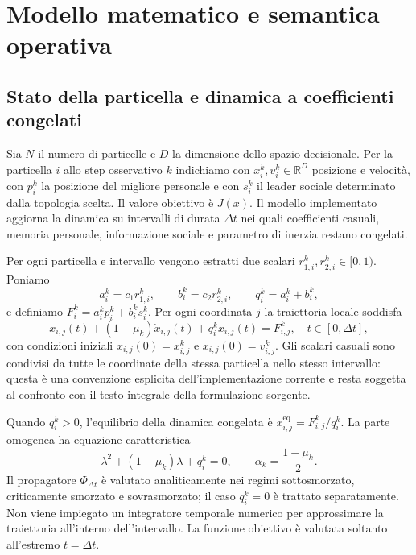 \section{Modello matematico e semantica operativa}
\label{sec:model}

\subsection{Stato della particella e dinamica a coefficienti congelati}

Sia $N$ il numero di particelle e $D$ la dimensione dello spazio decisionale. Per la particella $i$ allo step osservativo $k$ indichiamo con $x_i^k,v_i^k\in\mathbb{R}^D$ posizione e velocità, con $p_i^k$ la posizione del migliore personale e con $s_i^k$ il leader sociale determinato dalla topologia scelta. Il valore obiettivo è $J(x)$. Il modello implementato aggiorna la dinamica su intervalli di durata $\Delta t$ nei quali coefficienti casuali, memoria personale, informazione sociale e parametro di inerzia restano congelati.

Per ogni particella e intervallo vengono estratti due scalari $r_{1,i}^k,r_{2,i}^k\in[0,1)$. Poniamo
\begin{equation}
  a_i^k=c_1r_{1,i}^k,\qquad b_i^k=c_2r_{2,i}^k,
  \qquad q_i^k=a_i^k+b_i^k,
  \label{eq:frozen-coefficients}
\end{equation}
e definiamo $F_i^k=a_i^kp_i^k+b_i^ks_i^k$. Per ogni coordinata $j$ la traiettoria locale soddisfa
\begin{equation}
  \ddot{x}_{i,j}(t)+(1-\mu_k)\dot{x}_{i,j}(t)
  +q_i^kx_{i,j}(t)=F_{i,j}^k,
  \quad t\in[0,\Delta t],
  \label{eq:cpso-frozen-ode}
\end{equation}
con condizioni iniziali $x_{i,j}(0)=x_{i,j}^k$ e $\dot{x}_{i,j}(0)=v_{i,j}^k$. Gli scalari casuali sono condivisi da tutte le coordinate della stessa particella nello stesso intervallo: questa è una convenzione esplicita dell'implementazione corrente e resta soggetta al confronto con il testo integrale della formulazione sorgente.

Quando $q_i^k>0$, l'equilibrio della dinamica congelata è $x_{i,j}^{\mathrm{eq}}=F_{i,j}^k/q_i^k$. La parte omogenea ha equazione caratteristica
\begin{equation}
  \lambda^2+(1-\mu_k)\lambda+q_i^k=0,
  \qquad \alpha_k=\frac{1-\mu_k}{2}.
  \label{eq:characteristic}
\end{equation}
Il propagatore $\Phi_{\Delta t}$ è valutato analiticamente nei regimi sottosmorzato, criticamente smorzato e sovrasmorzato; il caso $q_i^k=0$ è trattato separatamente. Non viene impiegato un integratore temporale numerico per approssimare la traiettoria all'interno dell'intervallo. La funzione obiettivo è valutata soltanto all'estremo $t=\Delta t$.

